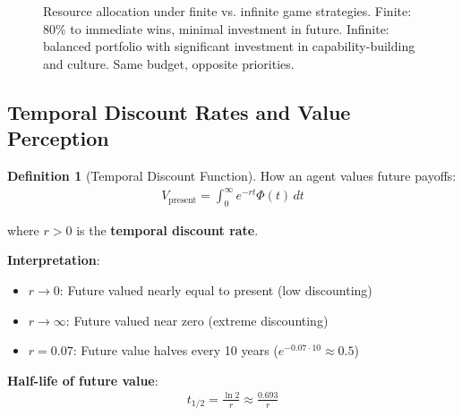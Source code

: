 \documentclass[11pt,a4paper]{article}
\theoremstyle{definition}
\newtheorem{definition}{Definition}[section]
\theoremstyle{remark}
\begin{document}
\begin{small}
\begin{enumerate}
\begin{figure}[H]
\caption{Resource allocation under finite vs. infinite game strategies. Finite: 80\% to immediate wins, minimal investment in future. Infinite: balanced portfolio with significant investment in capability-building and culture. Same budget, opposite priorities.}
\label{fig:resource_allocation}
\end{figure}

\subsection{Temporal Discount Rates and Value Perception}

\begin{definition}[Temporal Discount Function]
How an agent values future payoffs:
\begin{align}
V_{\text{present}} = \int_0^\infty e^{-r t} \Phi(t) \, dt
\end{align}

where \(r > 0\) is the \textbf{temporal discount rate}.

\textbf{Interpretation}:
\begin{itemize}
    \item \(r \to 0\): Future valued nearly equal to present (low discounting)
    \item \(r \to \infty\): Future valued near zero (extreme discounting)
    \item \(r = 0.07\): Future value halves every 10 years (\(e^{-0.07 \cdot 10} \approx 0.5\))
\end{itemize}

\textbf{Half-life of future value}:
\begin{align}
t_{1/2} = \frac{\ln 2}{r} \approx \frac{0.693}{r}
\end{align}
\end{definition}


\end{enumerate}
\end{small}
\end{document}
